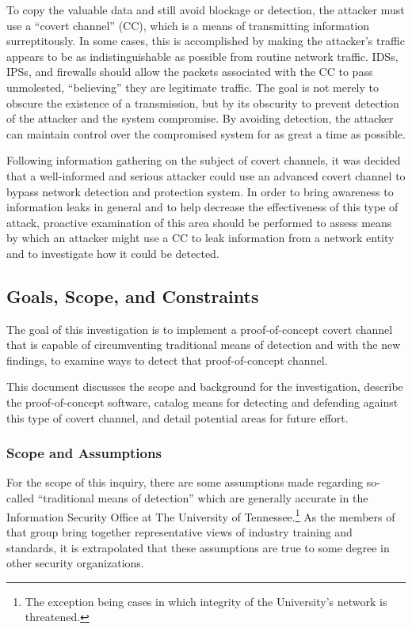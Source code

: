 \documentclass[letterpaper,10pt,draft]{article}
\begin{document}
To copy the valuable data and still avoid blockage or detection, the
attacker must use a ``covert channel'' (CC), which is a means of
transmitting information surreptitously.  In some cases, this is
accomplished by making the attacker's traffic appears to be as
indistinguishable as possible from routine network traffic. IDSs,
IPSs, and firewalls should allow the packets associated with the CC to
pass unmolested, ``believing'' they are legitimate traffic.  The goal
is not merely to obscure the existence of a transmission, but by its
obscurity to prevent detection of the attacker and the system
compromise.  By avoiding detection, the attacker can maintain control
over the compromised system for as great a time as possible.

Following information gathering on the subject of covert channels, it
was decided that a well-informed and serious attacker could use an
advanced covert channel to bypass network detection and protection
system.  In order to bring awareness to information leaks in general
and to help decrease the effectiveness of this type of attack,
proactive examination of this area should be performed to assess means
by which an attacker might use a CC to leak information from a network
entity and to investigate how it could be detected.

\subsection{Goals, Scope, and Constraints}

The goal of this investigation is to implement a proof-of-concept
covert channel that is capable of circumventing traditional means of
detection and with the new findings, to examine ways to detect that
proof-of-concept channel.

This document discusses the scope and background for the
investigation, describe the proof-of-concept software, catalog means
for detecting and defending against this type of covert channel, and
detail potential areas for future effort.

\subsubsection{Scope and Assumptions}

For the scope of this inquiry, there are some assumptions made
regarding so-called ``traditional means of detection'' which are
generally accurate in the Information Security Office at The
University of Tennessee.\footnote{The exception being cases in which
integrity of the University's network is threatened.}  As the members
of that group bring together representative views of industry
training and standards, it is extrapolated that these assumptions are
true to some degree in other security organizations.
\end{document}
